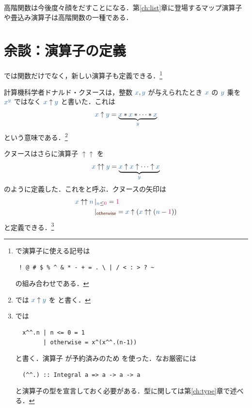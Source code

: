 \documentclass[a5paper,twoside,fleqn,draft]{jsbook}
\begin{document}
高階関数は今後度々顔をだすことになる．第\ref{ch:list}章に登場するマップ演算子や畳込み演算子は高階関数の一種である．

\section{余談：演算子の定義}

\haskell では関数だけでなく，新しい演算子も定義できる．\footnote{\haskell で演算子に使える記号は
\begin{verbatim}
 ! @ # $ % ^ & * - + = . \ | / < : > ? ~
\end{verbatim}%
の組み合わせである．}


計算機科学者ドナルド・クヌースは，整数 $\hVar{x},\hVar{y}$ が与えられたとき $\hVar{x}$ の $\hVar{y}$ 乗を ${\hVar{x}}^{\hVar{y}}$ ではなく $\hVar{x}\uparrow\hVar{y}$ と書いた．これは
\begin{equation}
  \hVar{x}\uparrow\hVar{y}
  =\underbrace{\hVar{x}*\hVar{x}*\dotsb*\hVar{x}}_{\hVar{y}}
\end{equation}
という意味である．\footnote{\haskell では $\hVar{x}\uparrow\hVar{y}$ を  と書く．}

クヌースはさらに演算子 $\uparrow\uparrow$ を
\begin{equation}
  \hVar{x}\uparrow\uparrow\hVar{y}
  =\underbrace{\hVar{x}\uparrow\hVar{x}\uparrow\dotsb\uparrow\hVar{x}}_{\hVar{y}}
\end{equation}
のように定義した．これをと呼ぶ．クヌースの矢印は
\begin{align}
  \hVar{x}\uparrow\uparrow\hVar{n}
  &\hGuard{\hVar{n}\le\hConstant{0}}=\hConstant{1}\\
  &\hGuard{\hOtherwise}
  =\hVar{x}\uparrow(\hVar{x}\uparrow\uparrow(\hVar{n}-\hConstant{1}))
\end{align}
と定義できる．\footnote{\haskell では
\begin{verbatim}
  x^^.n | n <= 0 = 1 
        | otherwise = x^(x^^.(n-1))
\end{verbatim}
と書く．演算子 \code{\textasciicircum\textasciicircum} が予約済みのため  を使った．なお厳密には
\begin{verbatim}
  (^^.) :: Integral a => a -> a -> a
\end{verbatim}
と演算子の型を宣言しておく必要がある．型に関しては第\ref{ch:type}章で述べる．}
\end{document}
